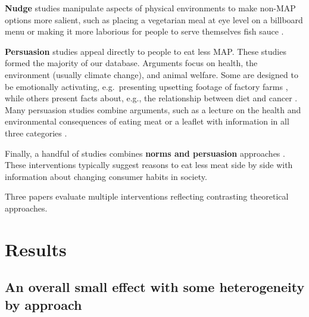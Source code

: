 \documentclass[sn-nature,pdflatex]{sn-jnl}
\begin{document}
\textbf{Nudge} studies \citep{andersson2021, kanchanachitra2020}
manipulate aspects of physical environments to make non-MAP options more
salient, such as placing a vegetarian meal at eye level on a billboard
menu \citep{andersson2021} or making it more laborious for people to
serve themselves fish sauce \citep{kanchanachitra2020}.

\textbf{Persuasion} studies
\citep{kanchanachitra2020, abrahamse2007, acharya2004, berndsen2005, bertolaso2015, bianchi2022, bochmann2017, bschaden2020, carfora2023, cooney2016, fehrenbach2015, feltz2022, haile2021, hatami2018, hennessy2016, mathur2021effectiveness, norris2014, peacock2017, polanco2022, sparkman2021, jalil2023, merrill2009, weingarten2022}
appeal directly to people to eat less MAP. These studies formed the
majority of our database. Arguments focus on health, the environment
(usually climate change), and animal welfare. Some are designed to be
emotionally activating, e.g.~presenting upsetting footage of factory
farms \citep{bertolaso2015}, while others present facts about, e.g., the
relationship between diet and cancer \citep{hatami2018}. Many persuasion
studies combine arguments, such as a lecture on the health and
environmental consequences of eating meat \citep{jalil2023} or a leaflet
with information in all three categories \citep{hennessy2016}.

Finally, a handful of studies combines \textbf{norms and persuasion}
approaches \citep{hennessy2016, carfora2023, mattson2020, piester2020}.
These interventions typically suggest reasons to eat less meat side by
side with information about changing consumer habits in society.

Three papers \citep{piester2020, hennessy2016, kanchanachitra2020}
evaluate multiple interventions reflecting contrasting theoretical
approaches.

\begin{comment} 
Note that two interventions also provide free meat alternatives?
\end{comment}

\section{Results}\label{sec2}

\subsection{An overall small effect with some heterogeneity by
approach}\label{sec2.1}
\end{document}
